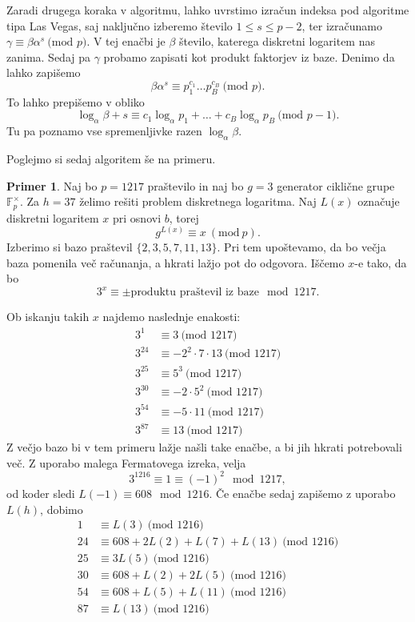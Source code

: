 \documentclass[12pt,a4paper,twoside]{article}
\theoremstyle{definition} %
\newtheorem{primer}[definicija]{Primer}
\theoremstyle{plain} %
\numberwithin{equation}{section}  %
\newcommand{\F}{\mathbb F}
\newcommand{\MOD}[1]{\ \text{(mod }{#1}\text{)}}
\begin{document}
Zaradi drugega koraka v algoritmu, lahko uvrstimo izračun indeksa pod algoritme tipa Las Vegas, saj naključno izberemo število $1\leq s \leq p-2$, ter izračunamo $\gamma \equiv \beta \alpha^s \MOD{p}$. V tej enačbi je $\beta$ število, katerega diskretni logaritem nas zanima. Sedaj pa $\gamma$ probamo zapisati kot produkt faktorjev iz baze. Denimo da lahko zapišemo
$$\beta \alpha^s \equiv  p_1^{c_1}\ldots p_B^{c_B} \MOD{p}.$$
To lahko prepišemo v obliko
$$\log_{\alpha}\beta + s \equiv c_1\log_{\alpha}p_1 + \ldots + c_B\log_{\alpha}p_B \MOD{p-1}.$$
Tu pa poznamo vse spremenljivke razen $\log_{\alpha}\beta$.

Poglejmo si sedaj algoritem še na primeru.
\begin{primer}
Naj bo $p = 1217$ praštevilo in naj bo $g = 3$ generator ciklične grupe $\F^{\times}_{p}$. Za $h = 37$ želimo rešiti problem diskretnega logaritma. Naj $L(x)$ označuje diskretni logaritem $x$ pri osnovi $b$, torej
$$g^{L(x)} \equiv x \ (\text{mod} \ p).$$
Izberimo si bazo praštevil $\{ 2,3,5,7,11,13 \}$. Pri tem upoštevamo, da bo večja baza pomenila več računanja, a hkrati lažjo pot do odgovora. Iščemo $x$-e  tako, da bo
$$3^x \equiv \pm \text{produktu praštevil iz baze} \mod 1217.$$

Ob iskanju takih $x$ najdemo naslednje enakosti:
\begin{align}
3^1 &\equiv 3 \MOD{1217} \nonumber \\ 
3^{24}  &\equiv -2^2\cdot 7\cdot 13 \MOD{1217} \nonumber \\
3^{25}  &\equiv 5^3 \MOD{1217} \nonumber \\
3^{30}  &\equiv -2 \cdot 5^2 \MOD{1217} \nonumber \\
3^{54}  &\equiv -5\cdot 11 \MOD{1217} \nonumber \\
3^{87}  &\equiv 13 \MOD{1217} \nonumber
\end{align}
Z večjo bazo bi v tem primeru lažje našli take enačbe, a bi jih hkrati potrebovali več.
Z uporabo malega Fermatovega izreka, velja
$$3^{1216} \equiv 1 \equiv (-1)^2 \mod 1217, $$
od koder sledi $L(-1) \equiv 608 \mod 1216$.
Če enačbe sedaj zapišemo z uporabo $L(h)$, dobimo
\begin{align}
1 &\equiv L(3) \MOD{1216} \nonumber \\ 
24&\equiv 608 + 2L(2) + L(7) +L(13) \MOD{1216} \nonumber \\
25 &\equiv 3L(5) \MOD{1216} \nonumber \\
30 &\equiv 608+L(2)+2L(5) \MOD{1216} \nonumber \\
54 &\equiv 608+L(5)+L(11) \MOD{1216} \nonumber \\
87  &\equiv L(13) \MOD{1216}  \nonumber
\end{align}


\end{primer}
\end{document}

